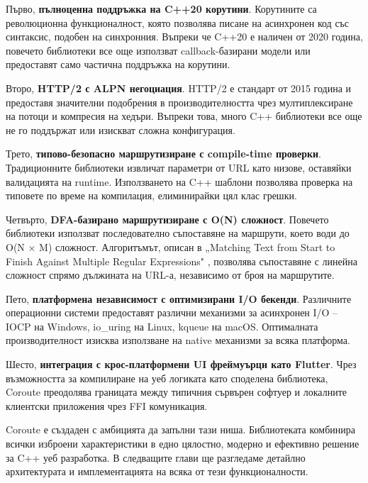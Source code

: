 Първо, \textbf{пълноценна поддръжка на C++20 корутини}. Корутините са революционна функционалност, която позволява писане на асинхронен код със синтаксис, подобен на синхронния. Въпреки че C++20 е наличен от 2020 година, повечето библиотеки все още използват callback-базирани модели или предоставят само частична поддръжка на корутини.

Второ, \textbf{HTTP/2 с ALPN негоциация}. HTTP/2 е стандарт от 2015 година и предоставя значителни подобрения в производителността чрез мултиплексиране на потоци и компресия на хедъри. Въпреки това, много C++ библиотеки все още не го поддържат или изискват сложна конфигурация.

Трето, \textbf{типово-безопасно маршрутизиране с compile-time проверки}. Традиционните библиотеки извличат параметри от URL като низове, оставяйки валидацията на runtime. Използването на C++ шаблони позволява проверка на типовете по време на компилация, елиминирайки цял клас грешки.

Четвърто, \textbf{DFA-базирано маршрутизиране с O(N) сложност}. Повечето библиотеки използват последователно съпоставяне на маршрути, което води до O(N × M) сложност. Алгоритъмът, описан в „Matching Text from Start to Finish Against Multiple Regular Expressions" \cite{stankov2024regex}, позволява съпоставяне с линейна сложност спрямо дължината на URL-а, независимо от броя на маршрутите.

Пето, \textbf{платформена независимост с оптимизирани I/O бекенди}. Различните операционни системи предоставят различни механизми за асинхронен I/O -- IOCP на Windows, io\_uring на Linux, kqueue на macOS. Оптималната производителност изисква използване на native механизми за всяка платформа.

Шесто, \textbf{интеграция с крос-платформени UI фреймуърци като Flutter}. Чрез възможността за компилиране на уеб логиката като споделена библиотека, Coroute преодолява границата между типичния сървърен софтуер и локалните клиентски приложения чрез FFI комуникация.

Coroute е създаден с амбицията да запълни тази ниша. Библиотеката комбинира всички изброени характеристики в едно цялостно, модерно и ефективно решение за C++ уеб разработка. В следващите глави ще разгледаме детайлно архитектурата и имплементацията на всяка от тези функционалности.

